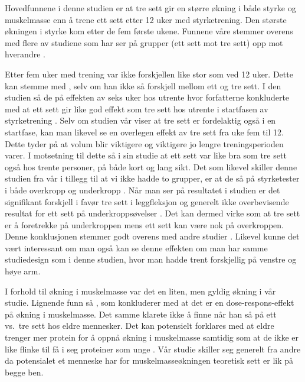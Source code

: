 \documentclass[
]{book}
\begin{document}
Hovedfunnene i denne studien er at tre sett gir en større økning i både styrke og muskelmasse enn å trene ett sett etter 12 uker med styrketrening. Den største økningen i styrke kom etter de fem første ukene. Funnene våre stemmer overens med flere av studiene som har ser på grupper (ett sett mot tre sett) opp mot hverandre \citep{krieger2009, galvão2005, schoenfeld2016}.

Etter fem uker med trening var ikke forskjellen like stor som ved 12 uker. Dette kan stemme med \citet{radaelli2014}, selv om han ikke så forskjell mellom ett og tre sett. I den studien så de på effekten av seks uker hos utrente hvor forfatterne konkluderte med at ett sett gir like god effekt som tre sett hos utrente i startfasen av styrketrening \citep{radaelli2014}. Selv om studien vår viser at tre sett er fordelaktig også i en startfase, kan man likevel se en overlegen effekt av tre sett fra uke fem til 12. Dette tyder på at volum blir viktigere og viktigere jo lengre treningsperioden varer. I motsetning til dette så \citet{hass2000} i sin studie at ett sett var like bra som tre sett også hos trente personer, på både kort og lang sikt. Det som likevel skiller denne studien fra vår i tillegg til at vi ikke hadde to grupper, er at de så på styrketester i både overkropp og underkropp \citep{hass2000}. Når man ser på resultatet i studien er det signifikant forskjell i favør tre sett i leggfleksjon og generelt ikke overbevisende resultat for ett sett på underkroppsøvelser \citep{hass2000}. Det kan dermed virke som at tre sett er å foretrekke på underkroppen mens ett sett kan være nok på overkroppen. Denne konklusjonen stemmer godt overens med andre studier \citep{rønnestad2007, paulsen2003}. Likevel kunne det vært interessant om man også kan se denne effekten om man har samme studiedesign som i denne studien, hvor man hadde trent forskjellig på venstre og høye arm.

I forhold til økning i muskelmasse var det en liten, men gyldig økning i vår studie. Lignende funn så \citet{schoenfeld2019}, som konkluderer med at det er en dose-respons-effekt på økning i muskelmasse. Det samme klarete ikke \citet{galvão2005} å finne når han så på ett vs.~tre sett hos eldre mennesker. Det kan potensielt forklares med at eldre trenger mer protein for å oppnå økning i muskelmasse samtidig som at de ikke er like flinke til få i seg proteiner som unge \citep{kraemer1999, moore2015}. Vår studie skiller seg generelt fra andre da potensialet et menneske har for muskelmasseøkningen teoretisk sett er lik på begge ben.
\end{document}
